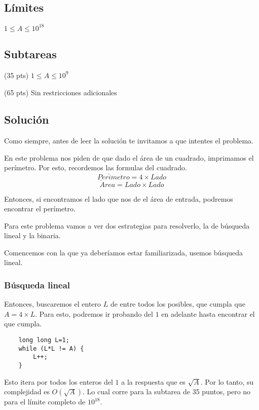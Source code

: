 \subsection*{Límites}
\begin{plimits}
	\item \(1\leq A \leq 10^{18}\)
\end{plimits}
\subsection*{Subtareas}
\begin{plimits}
	\item (35 pts) \(1\leq A \leq 10^9\)
	\item (65 pts) Sin restricciones adicionales
\end{plimits}

\subsection*{Solución}
Como siempre, antes de leer la solución te invitamos a que intentes el problema.


En este problema nos piden de que dado el área de un cuadrado, imprimamos el perímetro. Por esto, recordemos las formulas del cuadrado.
\[Per\acute{i}metro=4\times Lado \]
\[\acute{A}rea=Lado\times Lado \]

Entonces, si encontramos el lado que nos de el área de entrada, podremos encontrar el perímetro.

Para este problema vamos a ver dos estrategias para resolverlo, la de búsqueda lineal y la binaria.

Comencemos con la que ya deberíamos estar familiarizada, usemos búsqueda lineal.

\subsubsection*{Búsqueda lineal}
Entonces, buscaremos el entero \(L\) de entre todos los posibles, que cumpla que \(A=4\times L\). Para esto, podremos ir probando del \(1\) en adelante hasta encontrar el que cumpla.

\begin{lstlisting}
	long long L=1;
	while (L*L != A) {
		L++;
	}
\end{lstlisting}

Esto itera por todos los enteros del \(1\) a la respuesta que es \(\sqrt{A}\). Por lo tanto, su complejidad es \(O(\sqrt{A})\). Lo cual corre para la subtarea de 35 puntos, pero no para el límite completo de \(10^{18}\).

